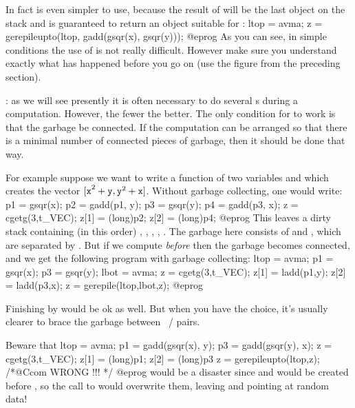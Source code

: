 
\noindent In fact  is even simpler to use, because the
result of  will be the last object on the stack and  is
guaranteed to return an object suitable for :
\bprog
  ltop = avma;
  z = gerepileupto(ltop, gadd(gsqr(x), gsqr(y)));
@eprog
\noindent
As you can see, in simple conditions the use of  is not really
difficult. However make sure you understand exactly what has happened before
you go on (use the figure from the preceding section).

: as we will see presently it is often
necessary to do several s during a computation. However, the
fewer the better.  The only condition for  to work is that the
garbage be connected. If the computation can be arranged so that there is a
minimal number of connected pieces of garbage, then it should be done that
way.

For example suppose we want to write a function of two  variables
 and  which creates the vector ${\tt [x}^2+{\tt y},
{\tt y}^2+{\tt x]}$. Without garbage collecting, one would write:
%
\bprog
  p1 = gsqr(x); p2 = gadd(p1, y);
  p3 = gsqr(y); p4 = gadd(p3, x);
  z = cgetg(3,t_VEC);
  z[1] = (long)p2;
  z[2] = (long)p4;
@eprog
\noindent
This leaves a dirty stack containing (in this order) , ,
, , . The garbage here consists of  and
, which are separated by . But if we compute 
{\it before\/}  then the garbage becomes connected, and we get the
following program with garbage collecting:
%
\bprog
  ltop = avma; p1 = gsqr(x); p3 = gsqr(y); lbot = avma;
  z = cgetg(3,t_VEC);
  z[1] = ladd(p1,y);
  z[2] = ladd(p3,x);
  z = gerepile(ltop,lbot,z);
@eprog

\noindent Finishing by  would be ok as well.
But when you have the choice, it's usually clearer to brace the garbage
between ~/  pairs.

\noindent Beware that
\bprog
  ltop = avma; p1 = gadd(gsqr(x), y); p3 = gadd(gsqr(y), x);
  z = cgetg(3,t_VEC);
  z[1] = (long)p1;
  z[2] = (long)p3
  z = gerepileupto(ltop,z); /*@Ccom WRONG !!! */
@eprog
\noindent would be a disaster since  and  would be created
before , so the call to  would overwrite them,
leaving  and  pointing at random data!

